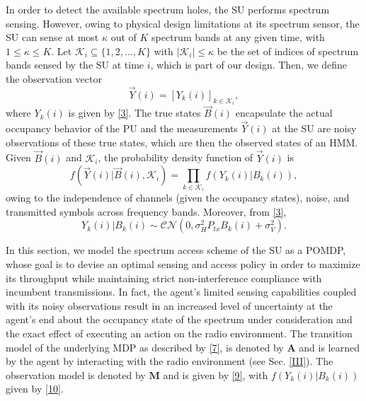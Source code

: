 \documentclass[10pt,twocolumn]{IEEEtran}
\begin{document}
In order to detect the available spectrum holes, the SU performs spectrum sensing. However, owing to physical design limitations at its spectrum sensor, the SU can sense at most $\kappa$ out of $K$ spectrum bands at any given time, with $1{\leq}\kappa{\leq}K$. Let $\mathcal K_{i}{\subseteq}\{1,2,\dots,K\}$ with $|\mathcal K_i|{\leq}\kappa$ be the set of indices of spectrum bands sensed by the SU at time $i$, which is part of our design.
Then, we define the observation vector
\begin{equation}\label{8}
    \vec{Y}(i) = [Y_k(i)]_{k {\in} \mathcal K_i},
\end{equation}
where $Y_k(i)$ is given by \eqref{3}.
The true states $\vec{B}(i)$ encapsulate the actual occupancy behavior of the PU and the measurements $\vec{Y}(i)$ at the SU are noisy observations of these true states, which are then the observed states of an HMM. Given $\vec{B}(i)$ and $\mathcal K_i$, the probability density function of $\vec{Y}(i)$ is
\begin{equation}\label{9}
    f(\vec{Y}(i)|\vec{B}(i), \mathcal K_i) = \prod_{k \in \mathcal K_i} f(Y_k(i)|B_k(i)),
\end{equation}
owing to the independence of channels (given the occupancy states), noise, and transmitted symbols across frequency bands. Moreover, from \eqref{3},
\begin{equation}\label{10}
 Y_k(i)|B_k(i) \sim \mathcal{CN}(0, \sigma_H^2P_{tx}B_k(i) + \sigma_V^2).
\end{equation}

In this section, we model the spectrum access scheme of the SU as a POMDP, whose goal is to devise an optimal sensing and access policy in order to maximize its throughput while maintaining strict non-interference compliance with incumbent transmissions. In fact, the agent's limited sensing capabilities coupled with its noisy observations result in an increased level of uncertainty at the agent's end about the occupancy state of the spectrum under consideration and the exact effect of executing an action on the radio environment. The transition model of the underlying MDP as described by \eqref{7}, is denoted by $\mathbf{A}$ and is learned by the agent by interacting with the radio environment (see Sec. \ref{III}). The observation model is denoted by $\mathbf{M}$ and is given by \eqref{9}, with $f(Y_k(i)|B_k(i))$ given by \eqref{10}. 
\end{document}
